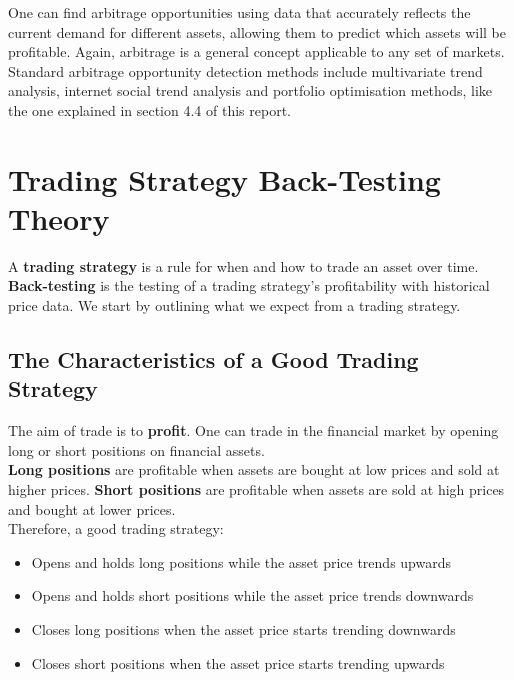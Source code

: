 \documentclass[11pt]{article}
\begin{document}
One can find arbitrage opportunities using data that accurately reflects the current demand for different assets, allowing them to predict which assets will be profitable.
Again, arbitrage is a general concept applicable to any set of markets.\\

Standard arbitrage opportunity detection methods include multivariate trend analysis, internet social trend analysis and portfolio optimisation methods, like the one explained in section 4.4 of this report.

\section{Trading Strategy Back-Testing Theory}

A \textbf{trading strategy} is a rule for when and how to trade an asset over time.
\textbf{Back-testing} is the testing of a trading strategy's profitability with historical price data.
We start by outlining what we expect from a trading strategy.

\subsection{The Characteristics of a Good Trading Strategy}

The aim of trade is to \textbf{profit}.
One can trade in the financial market by opening long or short positions on financial assets.\\

\textbf{Long positions} are profitable when assets are bought at low prices and sold at higher prices.
\textbf{Short positions} are profitable when assets are sold at high prices and bought at lower prices.\\

Therefore, a good trading strategy:
\begin{itemize}
    \item Opens and holds long positions while the asset price trends upwards
    \item Opens and holds short positions while the asset price trends downwards
    \item Closes long positions when the asset price starts trending downwards
    \item Closes short positions when the asset price starts trending upwards
\end{itemize}
\end{document}
